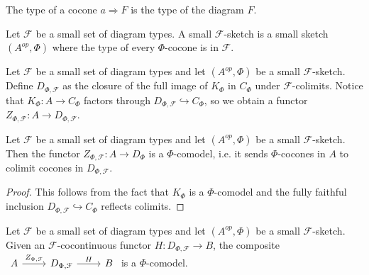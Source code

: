 \begin{definition}

  \noindent The type of a cocone $a\Rightarrow F$ is the type of the diagram
  $F$.
\end{definition}

\begin{definition}

  \noindent Let $\mathcal{F}$ be a small set of diagram types. A small
  $\mathcal{F}$-sketch is a small sketch $(A^{op},\Phi)$ where the type of
  every $\Phi$-cocone is in $\mathcal{F}$.
\end{definition}


\begin{definition}

  \noindent Let $\mathcal{F}$ be a small set of diagram types and let
  $(A^{op},\Phi)$ be a small $\mathcal{F}$-sketch. Define
  $D_{\Phi,\mathcal{F}}$ as the closure of the full image of $K_{\Phi}$ in
  $C_{\Phi}$ under $\mathcal{F}$-colimits. Notice that $K_{\Phi}:A\to
  C_{\Phi}$ factors through $D_{\Phi,\mathcal{F}}\hookrightarrow C_{\Phi}$, so
  we obtain a functor $Z_{\Phi,\mathcal{F}}:A\to D_{\Phi,\mathcal{F}}$.
\end{definition}

\begin{lemma}
  Let $\mathcal{F}$ be a small set of diagram types and let $(A^{op},\Phi)$ be
  a small $\mathcal{F}$-sketch. Then the functor $Z_{\Phi,\mathcal{F}}:A\to
  D_{\Phi}$ is a $\Phi$-comodel, i.e. it sends $\Phi$-cocones in $A$ to
  colimit cocones in $D_{\Phi,\mathcal{F}}$.
\end{lemma}

\begin{proof}
  This follows from the fact that $K_{\Phi}$ is a $\Phi$-comodel and the fully
  faithful inclusion $D_{\Phi,\mathcal{F}}\hookrightarrow C_{\Phi}$ reflects
  colimits.
\end{proof}

\begin{lemma}
  Let $\mathcal{F}$ be a small set of diagram types and let $(A^{op},\Phi)$ be
  a small $\mathcal{F}$-sketch. Given an $\mathcal{F}$-cocontinuous functor
  $H:D_{\Phi,\mathcal{F}}\to B$, the composite $
  \begin{tikzcd} A &
    D_{\Phi,\mathcal{F}} & B \arrow["Z_{\Phi,\mathcal{F}}", from=1-1, to=1-2]
    \arrow["H", from=1-2, to=1-3]
  \end{tikzcd}$
  is a $\Phi$-comodel.
\end{lemma}

